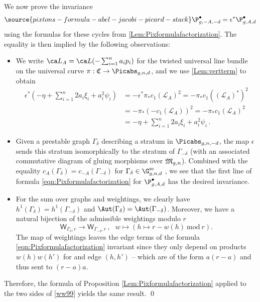 We now prove the invariance
\begin{equation}\label{ww99}
\source{pixtons-formula-abel-jacobi-picard-stack}
\P_{g,-A,-d}^\bullet = \epsilon^*\P_{g,A,d}^\bullet
\end{equation}
using the formulas for these cycles from \cref{Lem:Pixformulafactorization}. The equality is then implied by the following observations:
\begin{itemize}
\item We write  $\ca L_A = \ca L(- \sum_{i=1}^n a_i p_i)$ for the twisted universal line bundle on the universal curve $\pi: \frak C \to \Picabs_{g,n,d}$, and we use \cref{Lem:vertterm} to obtain
\begin{align*}
    \epsilon^* \left(-\eta + \sum_{i=1}^n 2 a_i \xi_i+ a_i^2 \psi_i \right) &= - \epsilon^* \pi_* c_1(\mathcal{L}_A)^2 = - \pi_* c_1((\mathcal{L}_A)^*)^2\\ &= - \pi_* (-c_1(\mathcal{L}_A))^2= - \pi_* c_1(\mathcal{L}_A)^2\\
    &=-\eta + \sum_{i=1}^n 2 a_i \xi_i+ a_i^2 \psi_i\, .
\end{align*}
\item Given a prestable graph $\Gamma_\delta$ describing a stratum in $\Picabs_{g,n,-d}$, the map $\epsilon$ sends this stratum isomorphically to the stratum of $\Gamma_{-\delta}$ (with an associated commutative diagram of gluing morphisms over $\frak M_{g,n}$). Combined with the equality $c_A(\Gamma_\delta) = c_{-A}(\Gamma_{-\delta})$ for $\Gamma_\delta \in \G_{g,n,d}^\textup{se}$ , we see  that the first line of formula \eqref{eqn:Pixformulafactorization} for $\P_{g,A,d}^\bullet$ has the desired invariance.
\item For the sum over graphs and weightings, we clearly have $h^1(\Gamma_\delta) = h^1(\Gamma_{-\delta})$ and $\Aut(\Gamma_\delta)=\Aut(\Gamma_{-\delta})$. Moreover, we have a natural bijection of the admissible weightings modulo $r$
\[\mathsf{W}_{\Gamma_\delta,r} \to \mathsf{W}_{\Gamma_{-\delta},r}\, , \ \ \ w \mapsto (h \mapsto r-w(h) \ \text{mod}\ r).\]
The  map of weightings leaves the edge terms of the formula \eqref{eqn:Pixformulafactorization} invariant  since they only depend on products $w(h)w(h')$ for and edge $(h,h')$ --  which are of the form $a(r-a)$ and thus sent to $(r-a)a$.
\end{itemize}
Therefore, the formula of Proposition \ref{Lem:Pixformulafactorization} applied to
the two sides of \eqref{ww99} yields the same result. \qed


